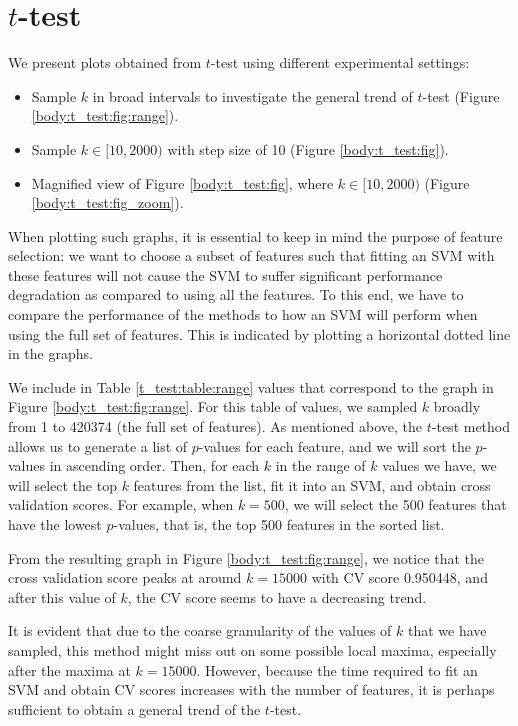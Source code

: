 \documentclass[12pt, twoside, a4paper]{report}
\begin{document}
\section{$t$-test}
We present plots obtained from $t$-test using different experimental settings:
\begin{itemize}
  \item Sample $k$ in broad intervals to investigate the general trend of $t$-test (Figure \ref{body:t_test:fig:range}).
  \item Sample $k\in [10,2000)$ with step size of 10 (Figure \ref{body:t_test:fig}).
  \item Magnified view of Figure \ref{body:t_test:fig}, where $k \in [10,2000)$ (Figure \ref{body:t_test:fig_zoom}).
\end{itemize}

When plotting such graphs, it is essential to keep in mind the purpose of feature selection: we want to choose a subset of features such that fitting an SVM with these features will not cause the SVM to suffer significant performance degradation as compared to using all the features. To this end, we have to compare the performance of the methods to how an SVM will perform when using the full set of features. This is indicated by plotting a horizontal dotted line in the graphs.

We include in Table \ref{t_test:table:range} values that correspond to the graph in Figure \ref{body:t_test:fig:range}. For this table of values, we sampled $k$ broadly from 1 to 420374 (the full set of features). As mentioned above, the $t$-test method allows us to generate a list of $p$-values for each feature, and we will sort the $p$-values in ascending order. Then, for each $k$ in the range of $k$ values we have, we will select the top $k$ features from the list, fit it into an SVM, and obtain cross validation scores. For example, when $k=500$, we will select the 500 features that have the lowest $p$-values, that is, the top 500 features in the sorted list.

From the resulting graph in Figure \ref{body:t_test:fig:range}, we notice that the cross validation score peaks at around $k=15000$ with CV score 0.950448, and after this value of $k$, the CV score seems to have a decreasing trend.

It is evident that due to the coarse granularity of the values of $k$ that we have sampled, this method might miss out on some possible local maxima, especially after the maxima at $k=15000$. However, because the time required to fit an SVM and obtain CV scores increases with the number of features, it is perhaps sufficient to obtain a general trend of the $t$-test.
\end{document}
